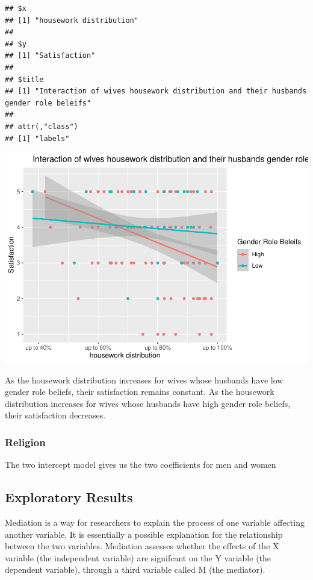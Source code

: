 \documentclass[
  english,
  man,floatsintext]{apa6}
\begin{document}
\begin{verbatim}
## $x
## [1] "housework distribution"
## 
## $y
## [1] "Satisfaction"
## 
## $title
## [1] "Interaction of wives housework distribution and their husbands gender role beleifs"
## 
## attr(,"class")
## [1] "labels"
\end{verbatim}

\includegraphics{results_files/figure-latex/unnamed-chunk-11-1.pdf}

As the housework distribution increases for wives whose husbands have low gender role beliefs, their satisfaction remains constant. As the housework distribution increases for wives whose husbands have high gender role beliefs, their satisfaction decreases.

\hypertarget{religion}{%
\subsubsection{Religion}\label{religion}}

The two intercept model gives us the two coefficients for men and women

\hypertarget{exploratory-results}{%
\subsection{Exploratory Results}\label{exploratory-results}}

Mediation is a way for researchers to explain the process of one variable affecting another variable. It is essentially a possible explanation for the relationship between the two variables. Mediation assesses whether the effects of the X variable (the independent variable) are signifcant on the Y variable (the dependent variable), through a third variable called M (the mediator).
\end{document}
